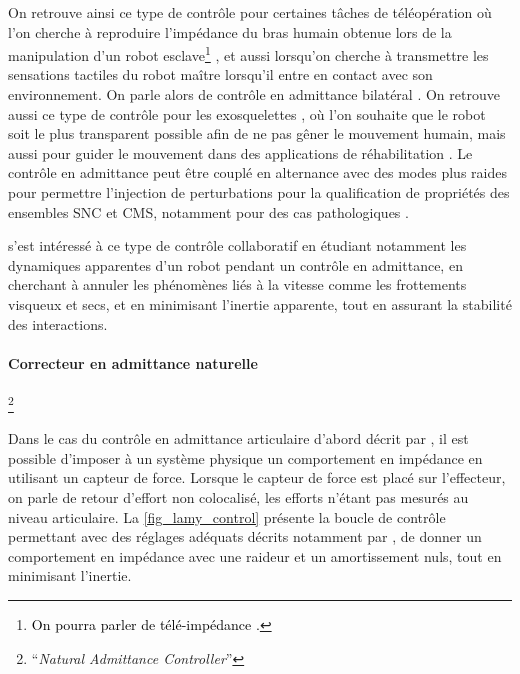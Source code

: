 On retrouve ainsi ce type de contrôle pour certaines tâches de téléopération où l'on cherche à reproduire l'impédance du bras humain obtenue lors de la manipulation d'un robot esclave\footnote{\textcolor{black}{On pourra parler de télé-impédance \parencite{ajoudani_tele-impedance_2012}.}} \textcolor{black}{\parencite{ajoudani_tele-impedance_2012,laghi_unifying_2020}}, et aussi lorsqu'on cherche à transmettre les sensations tactiles du robot maître lorsqu'il entre en contact avec son environnement. On parle alors de contrôle en admittance bilatéral \parencite{hashtrudi-zaad_analysis_2001, tufail_impedance_2014}. On retrouve aussi ce type de contrôle pour les exosquelettes \parencite{huang_admittance_2017}, où l'on souhaite que le robot soit le plus transparent possible afin de ne pas gêner le mouvement humain, mais aussi pour guider le mouvement dans des applications de réhabilitation \parencite{ozkul_design_2011}. Le contrôle en admittance peut être couplé en alternance avec des modes plus raides pour permettre l'injection de perturbations pour la qualification de propriétés des ensembles SNC et CMS, notamment pour des cas pathologiques \parencite{stienen_act-4d_2011}.

\textcite{lamy_achieving_2009} s'est intéressé à ce type de contrôle collaboratif en étudiant notamment les dynamiques apparentes d'un robot pendant un contrôle en admittance, en cherchant à annuler les phénomènes liés à la vitesse comme les frottements visqueux et secs, et en minimisant l'inertie apparente, tout en assurant la stabilité des interactions.

\paragraph{Correcteur en admittance naturelle}\footnote{\foreignquote{french}{\textit{Natural Admittance Controller}}} \label{chap2_sec_cmd_collab_subsec_cmd_imp_2_1}

Dans le cas du contrôle en admittance articulaire d'abord décrit par \textcite{newman_stability_1992}, il est possible d'imposer à un système physique un comportement en impédance en utilisant un capteur de force. Lorsque le capteur de force est placé sur l'effecteur, on parle de retour d'effort non colocalisé, les efforts n'étant pas mesurés au niveau articulaire. La \cref{fig_lamy_control} présente la boucle de contrôle permettant avec des réglages adéquats décrits notamment par \textcite{lamy_achieving_2009}, de donner un comportement en impédance avec une raideur et un amortissement nuls, tout en minimisant l'inertie. 
 
